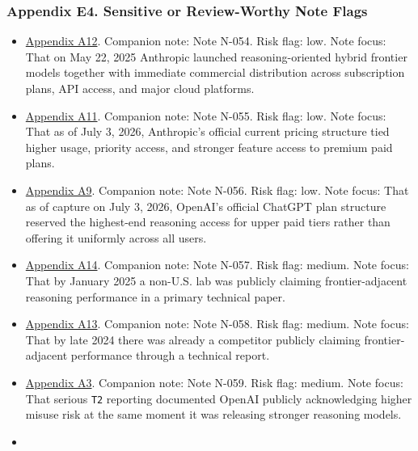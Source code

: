 \documentclass[
  american,
  11pt,
  letterpaper,
]{article}
\providecommand{\tightlist}{%
  \setlength{\itemsep}{0pt}\setlength{\parskip}{0pt}}
\begin{document}
\subsubsection{Appendix E4. Sensitive or Review-Worthy Note
Flags}\label{ch-06-appendix-e4-sensitive-or-review-worthy-note-flags}

\begin{itemize}
\tightlist
\item
  \hyperref[ch-06-appendix-a12-introducing-claude-4]{Appendix A12}.
  Companion note: Note N-054. Risk flag: low. Note focus: That on May
  22, 2025 Anthropic launched reasoning-oriented hybrid frontier models
  together with immediate commercial distribution across subscription
  plans, API access, and major cloud platforms.
\item
  \hyperref[ch-06-appendix-a11-plans-pricing-claude-by-anthropic]{Appendix
  A11}. Companion note: Note N-055. Risk flag: low. Note focus: That as
  of July 3, 2026, Anthropic's official current pricing structure tied
  higher usage, priority access, and stronger feature access to premium
  paid plans.
\item
  \hyperref[ch-06-appendix-a9-chatgpt-plans-free-go-plus-pro-business-and-enterprise]{Appendix
  A9}. Companion note: Note N-056. Risk flag: low. Note focus: That as
  of capture on July 3, 2026, OpenAI's official ChatGPT plan structure
  reserved the highest-end reasoning access for upper paid tiers rather
  than offering it uniformly across all users.
\item
  \hyperref[ch-06-appendix-a14-deepseek-r1-incentivizing-reasoning-capability-in-llms-via-reinforcement-learning]{Appendix
  A14}. Companion note: Note N-057. Risk flag: medium. Note focus: That
  by January 2025 a non-U.S. lab was publicly claiming frontier-adjacent
  reasoning performance in a primary technical paper.
\item
  \hyperref[ch-06-appendix-a13-deepseek-v3-technical-report]{Appendix
  A13}. Companion note: Note N-058. Risk flag: medium. Note focus: That
  by late 2024 there was already a competitor publicly claiming
  frontier-adjacent performance through a technical report.
\item
  \hyperref[ch-06-appendix-a3-openai-acknowledges-new-models-increase-risk-of-misuse-to-create-bioweapons]{Appendix
  A3}. Companion note: Note N-059. Risk flag: medium. Note focus: That
  serious \texttt{T2} reporting documented OpenAI publicly acknowledging
  higher misuse risk at the same moment it was releasing stronger
  reasoning models.
\item

\end{itemize}
\end{document}
